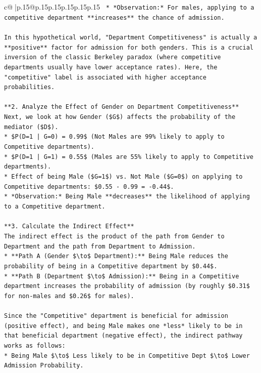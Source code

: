 \documentclass{article}
\begin{document}
{\begin{supertabular}{c@{$\;$}|p{.15\linewidth}@{}p{.15\linewidth}p{.15\linewidth}p{.15\linewidth}p{.15\linewidth}p{.15\linewidth}}
{{{\texttt{    *   *Observation:* For males, applying to a competitive department **increases** the chance of admission.} \\
\\ 
\texttt{In this hypothetical world, "Department Competitiveness" is actually a **positive** factor for admission for both genders. This is a crucial inversion of the classic Berkeley paradox (where competitive departments usually have lower acceptance rates). Here, the "competitive" label is associated with higher acceptance probabilities.} \\
\\ 
\texttt{**2. Analyze the Effect of Gender on Department Competitiveness**} \\
\texttt{Next, we look at how Gender (\$G\$) affects the probability of the mediator (\$D\$).} \\
\texttt{*   \$P(D=1 | G=0) = 0.99\$ (Not Males are 99\% likely to apply to Competitive departments).} \\
\texttt{*   \$P(D=1 | G=1) = 0.55\$ (Males are 55\% likely to apply to Competitive departments).} \\
\texttt{*   Effect of being Male (\$G=1\$) vs. Not Male (\$G=0\$) on applying to Competitive departments: \$0.55 {-} 0.99 = {-}0.44\$.} \\
\texttt{*   *Observation:* Being Male **decreases** the likelihood of applying to a Competitive department.} \\
\\ 
\texttt{**3. Calculate the Indirect Effect**} \\
\texttt{The indirect effect is the product of the path from Gender to Department and the path from Department to Admission.} \\
\texttt{*   **Path A (Gender \$\textbackslash{}to\$ Department):** Being Male reduces the probability of being in a Competitive department by \$0.44\$.} \\
\texttt{*   **Path B (Department \$\textbackslash{}to\$ Admission):** Being in a Competitive department increases the probability of admission (by roughly \$0.31\$ for non{-}males and \$0.26\$ for males).} \\
\\ 
\texttt{Since the "Competitive" department is beneficial for admission (positive effect), and being Male makes one *less* likely to be in that beneficial department (negative effect), the indirect pathway works as follows:} \\
\texttt{*   Being Male \$\textbackslash{}to\$ Less likely to be in Competitive Dept \$\textbackslash{}to\$ Lower Admission Probability.} \\
}}}
\end{supertabular}}
\end{document}
